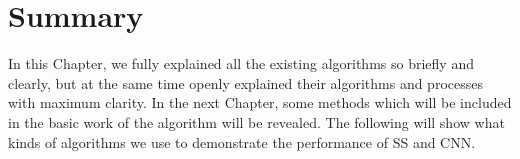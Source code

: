\vspace{-0.3cm}




\section{Summary}\label{sec:3.9}
\vspace{-0.5cm}
\noindent In this Chapter, we fully explained all the existing algorithms so briefly and clearly, but at the same time openly explained their algorithms and processes with maximum clarity. In the next Chapter, some methods which will be included in the basic work of the algorithm will be revealed. The following will show what kinds of algorithms we use to demonstrate the performance of SS and CNN.

\vspace{-0.3cm}



